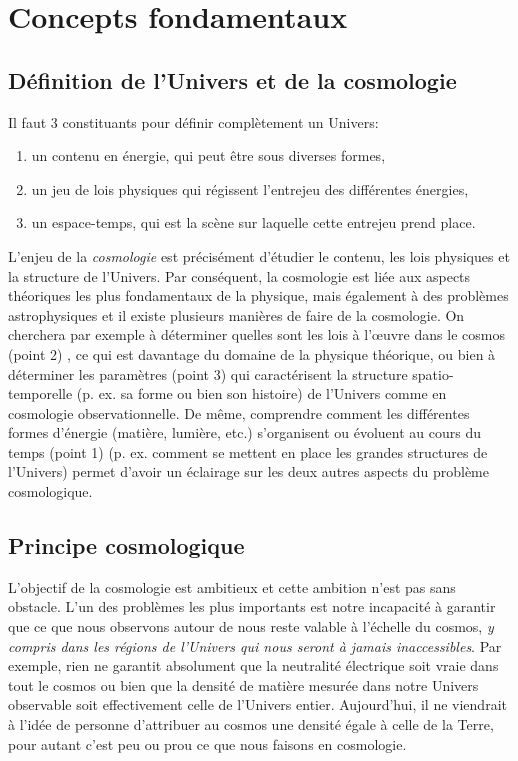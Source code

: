
\chapter{Concepts fondamentaux}

\section{Définition de l'Univers et de la cosmologie}
\label{s:fond_def}
 Il faut 3 constituants pour définir complètement un Univers:
\begin{enumerate}
\item un contenu en énergie, qui peut être sous diverses formes,
\item un jeu de lois physiques qui régissent l'entrejeu des différentes énergies,
\item un espace-temps, qui est la scène sur laquelle cette entrejeu prend place.
\end{enumerate} 
L'enjeu de la \textit{cosmologie} est précisément d'étudier le contenu, les lois physiques et la structure de l'Univers. Par conséquent, la cosmologie est liée aux aspects théoriques les plus fondamentaux de la physique, mais également à des problèmes astrophysiques et il existe plusieurs manières de faire de la cosmologie. On cherchera par exemple à déterminer quelles sont les lois à l'œuvre dans le cosmos (point 2) , ce qui est davantage du domaine de la physique théorique, ou bien à déterminer les paramètres (point 3)  qui caractérisent la structure spatio-temporelle (p. ex. sa forme ou bien son histoire) de l'Univers comme en cosmologie observationnelle. De même, comprendre comment les différentes formes d'énergie (matière, lumière, etc.) s'organisent ou évoluent au cours du temps (point 1) (p. ex. comment se mettent en place les grandes structures de l'Univers) permet d'avoir un éclairage sur les deux autres aspects du problème cosmologique.

\section{Principe cosmologique}
L'objectif de la cosmologie est ambitieux et cette ambition n'est pas sans obstacle. L'un des problèmes les plus importants est notre incapacité à garantir que ce que nous observons autour de nous reste valable à l'échelle du cosmos, \textit{y compris dans les régions de l'Univers qui nous seront à jamais inaccessibles}. Par exemple, rien ne garantit absolument que la neutralité électrique soit vraie dans tout le cosmos ou bien que la densité de matière mesurée dans notre Univers observable soit effectivement celle de l'Univers entier. Aujourd'hui, il ne viendrait à l'idée de personne d'attribuer au cosmos une densité égale à celle de la Terre, pour autant c'est peu ou prou ce que nous faisons en cosmologie. 


